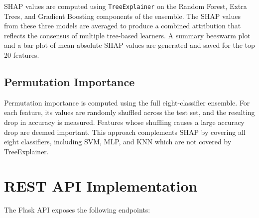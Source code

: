 SHAP values are computed using \texttt{TreeExplainer} on the Random Forest, Extra Trees, and Gradient Boosting components of the ensemble. The SHAP values from these three models are averaged to produce a combined attribution that reflects the consensus of multiple tree-based learners. A summary beeswarm plot and a bar plot of mean absolute SHAP values are generated and saved for the top 20 features.

\subsection{Permutation Importance}

Permutation importance is computed using the full eight-classifier ensemble. For each feature, its values are randomly shuffled across the test set, and the resulting drop in accuracy is measured. Features whose shuffling causes a large accuracy drop are deemed important. This approach complements SHAP by covering all eight classifiers, including SVM, MLP, and KNN which are not covered by TreeExplainer.

\section{REST API Implementation}

The Flask API exposes the following endpoints:

\begin{table}[H]
\centering
\renewcommand{\arraystretch}{1.3}
\caption{REST API Endpoints.}
\label{tab:apiendpoints}
\end{table}

